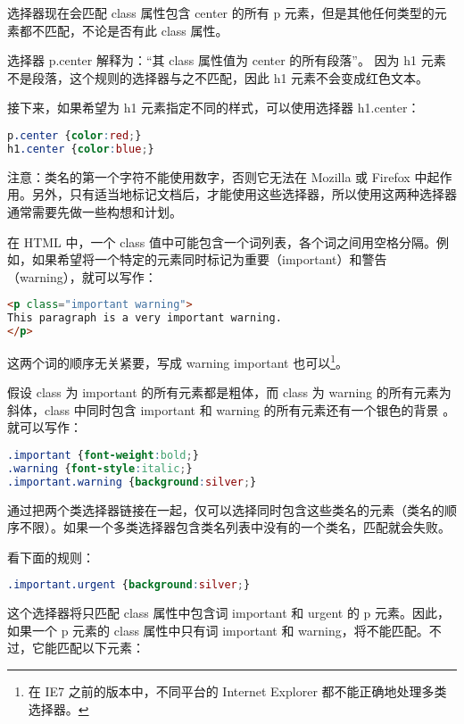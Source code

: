 选择器现在会匹配 class 属性包含 center 的所有 p 元素，但是其他任何类型的元素都不匹配，不论是否有此 class 属性。

选择器 p.center 解释为：“其 class 属性值为 center 的所有段落”。 因为 h1 元素不是段落，这个规则的选择器与之不匹配，因此 h1 元素不会变成红色文本。

接下来，如果希望为 h1 元素指定不同的样式，可以使用选择器 h1.center：

\begin{lstlisting}[language=CSS]
p.center {color:red;}
h1.center {color:blue;}
\end{lstlisting}


注意：类名的第一个字符不能使用数字，否则它无法在 Mozilla 或 Firefox 中起作用。另外，只有适当地标记文档后，才能使用这些选择器，所以使用这两种选择器通常需要先做一些构想和计划。


在 HTML 中，一个 class 值中可能包含一个词列表，各个词之间用空格分隔。例如，如果希望将一个特定的元素同时标记为重要（important）和警告（warning），就可以写作：


\begin{lstlisting}[language=HTML]
<p class="important warning">
This paragraph is a very important warning.
</p>
\end{lstlisting}



这两个词的顺序无关紧要，写成 warning important 也可以\footnote{在 IE7 之前的版本中，不同平台的 Internet Explorer 都不能正确地处理多类选择器。}。


假设 class 为 important 的所有元素都是粗体，而 class 为 warning 的所有元素为斜体，class 中同时包含 important 和 warning 的所有元素还有一个银色的背景 。就可以写作：

\begin{lstlisting}[language=CSS]
.important {font-weight:bold;}
.warning {font-style:italic;}
.important.warning {background:silver;}
\end{lstlisting}


通过把两个类选择器链接在一起，仅可以选择同时包含这些类名的元素（类名的顺序不限）。如果一个多类选择器包含类名列表中没有的一个类名，匹配就会失败。

看下面的规则：


\begin{lstlisting}[language=CSS]
.important.urgent {background:silver;}
\end{lstlisting}

这个选择器将只匹配 class 属性中包含词 important 和 urgent 的 p 元素。因此，如果一个 p 元素的 class 属性中只有词 important 和 warning，将不能匹配。不过，它能匹配以下元素：


